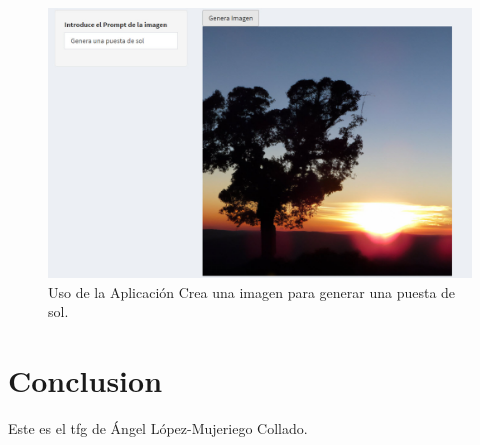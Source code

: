\documentclass[
]{book}
\begin{document}
\begin{figure}

{\centering \includegraphics[width=0.6\linewidth]{FIG15} 

}

\caption{Uso de la Aplicación Crea una imagen para generar una puesta de sol.}\label{fig:CURSO-14}
\end{figure}

\chapter{Conclusion}\label{conclusion}

Este es el tfg de Ángel López-Mujeriego Collado.

  
\end{document}
